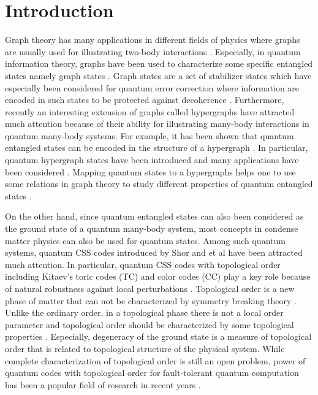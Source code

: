 \documentclass[preprintnumbers, showpacs, floatfix,twocolumn,
preprintnumbers, superscriptaddress]{revtex4}
\begin{document}
\section{Introduction}
Graph theory has many applications in different fields of physics where graphs are usually used for illustrating two-body interactions \cite{graphbook}. Especially, in quantum information theory, graphs have been used to characterize some specific entangled states namely graph states \cite{Briegel2004}. Graph states are a set of stabilizer states which have especially been considered for quantum error correction where information are encoded in such states to be protected against decoherence \cite{gott1997}. Furthermore, recently an interesting extension of graphs called hypergraphs \cite{Berg} have attracted much attention because of their ability for illustrating many-body interactions in quantum many-body systems. For example, it has been shown that quantum entangled states can be encoded in the structure of a hypergraph \cite{hyp2013}. In particular, quantum hypergraph states have been introduced and many applications have been considered \cite{Brus2013}. Mapping quantum states to a hypergraphs helps one to use some relations in graph theory to study different properties of quantum entangled states \cite{hyp1, hyp2, hyp3, hyp4}.

On the other hand, since quantum entangled states can also been considered as the ground state of a quantum many-body system, most concepts in condense matter physics can also be used for quantum states. Among such quantum systems, quantum CSS codes introduced by Shor and et al \cite{Calderbank1996, Stean} have been attracted much attention. In particular, quantum CSS codes with topological order including Kitaev's toric codes (TC) and color codes (CC) play a key role because of natural robustness against local perturbations \cite{Kitaev2003, bombin2006}. Topological order is a new phase of matter that can not be characterized by symmetry breaking theory \cite{Wen1990}. Unlike the ordinary order, in a topological phase there is not a local order parameter and topological order should be characterized by some topological properties \cite{Wen1991, Hansson2004, Rokhsar1988}. Especially, degeneracy of the ground state is a measure of topological order that is related to topological structure of the physical system. While complete characterization of topological order is still an open problem, power of quantum codes with topological order for fault-tolerant quantum computation has been a popular field of research in recent years \cite{16, preskill2002, freedman2002, 17, 18, bravi2010}.
\end{document}
